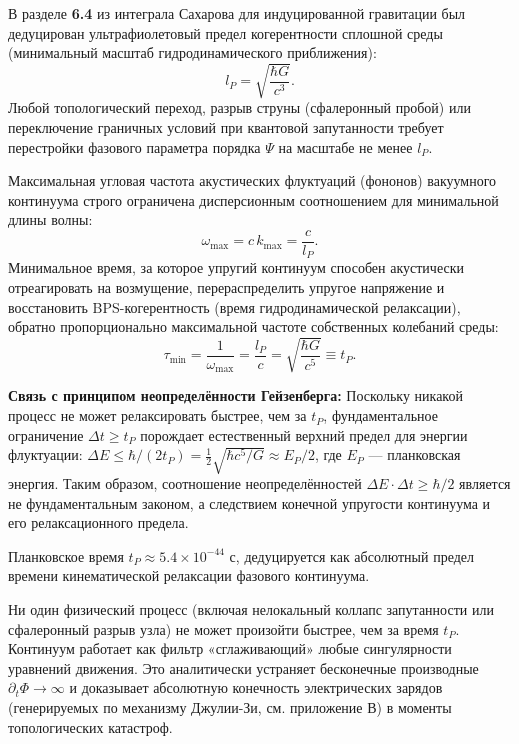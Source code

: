 \documentclass[11pt,a4paper]{article}
\begin{document}
	В разделе \textbf{6.4} из интеграла Сахарова для индуцированной гравитации был дедуцирован ультрафиолетовый предел когерентности сплошной среды (минимальный масштаб гидродинамического приближения):
	\begin{equation}
		l_P = \sqrt{\frac{\hbar G}{c^3}}.
	\end{equation}
	Любой топологический переход, разрыв струны (сфалеронный пробой) или переключение граничных условий при квантовой запутанности требует перестройки фазового параметра порядка $\Psi$ на масштабе не менее $l_P$.
	
	Максимальная угловая частота акустических флуктуаций (фононов) вакуумного континуума строго ограничена дисперсионным соотношением для минимальной длины волны:
	\begin{equation}
		\omega_{\text{max}} = c\, k_{\text{max}} = \frac{c}{l_P}.
	\end{equation}
	Минимальное время, за которое упругий континуум способен акустически отреагировать на возмущение, перераспределить упругое напряжение и восстановить BPS-когерентность (время гидродинамической релаксации), обратно пропорционально максимальной частоте собственных колебаний среды:
	\begin{equation}
		\tau_{\text{min}} = \frac{1}{\omega_{\text{max}}} = \frac{l_P}{c} = \sqrt{\frac{\hbar G}{c^5}} \equiv t_P.
	\end{equation}
	
	\textbf{Связь с принципом неопределённости Гейзенберга:}
	Поскольку никакой процесс не может релаксировать быстрее, чем за $t_P$, фундаментальное ограничение $\Delta t \ge t_P$ порождает естественный верхний предел для энергии флуктуации: $\Delta E \le \hbar / (2 t_P) = \frac12 \sqrt{\hbar c^5 / G} \approx E_P/2$, где $E_P$ — планковская энергия. Таким образом, соотношение неопределённостей $\Delta E \cdot \Delta t \ge \hbar/2$ является не фундаментальным законом, а следствием конечной упругости континуума и его релаксационного предела.
	
	Планковское время $t_P \approx 5.4\times10^{-44}$ с, дедуцируется как абсолютный предел времени кинематической релаксации фазового континуума.
	
	Ни один физический процесс (включая нелокальный коллапс запутанности или сфалеронный разрыв узла) не может произойти быстрее, чем за время $t_P$. Континуум работает как фильтр «сглаживающий» любые сингулярности уравнений движения. Это аналитически устраняет бесконечные производные $\partial_t \Phi \to \infty$ и доказывает абсолютную конечность электрических зарядов (генерируемых по механизму Джулии-Зи, см. приложение В) в моменты топологических катастроф.
	
\end{document}
